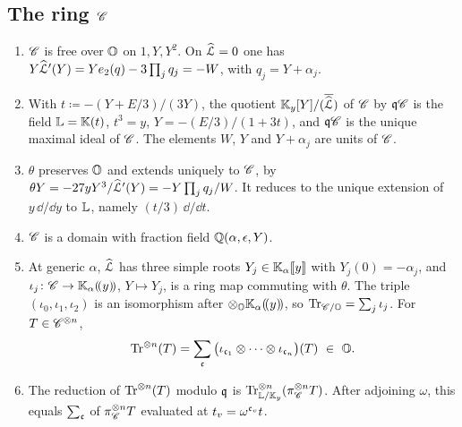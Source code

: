 \subsection{The ring \texorpdfstring{$\mathscr{C}$}{C}}

\begin{lem}
\label{lem:spe-ring}
\begin{enumerate}
\item $\mathscr{C}$ is free over $\mathbb{O}$ on $1,Y,Y^2$. On $\widehat{\mathcal{L}}=0$ one has $Y\widehat{\mathcal{L}}'(Y)=Ye_2(q)-3\prod_jq_j=-W$, with $q_j=Y+\alpha_j$.
\item With $t\coloneqq-(Y+E/3)/(3Y)$, the quotient $\mathbb{K}_{y}[Y]/(\overline{\widehat{\mathcal{L}}})$ of $\mathscr{C}$ by $\mathfrak{q}\mathscr{C}$ is the field $\mathbb{L}=\mathbb{K}(t)$, $t^3=y$, $Y=-(E/3)/(1+3t)$, and $\mathfrak{q}\mathscr{C}$ is the unique maximal ideal of $\mathscr{C}$. The elements $W$, $Y$ and $Y+\alpha_j$ are units of $\mathscr{C}$.
\item $\theta$ preserves $\mathbb{O}$ and extends uniquely to $\mathscr{C}$, by $\theta Y=-27yY^3/\widehat{\mathcal{L}}'(Y)=-Y\prod_jq_j/W$. It reduces to the unique extension of $y\,\dd/\dd y$ to $\mathbb{L}$, namely $(t/3)\,\dd/\dd t$.
\item $\mathscr{C}$ is a domain with fraction field $\mathbb{Q}(\alpha,\epsilon,Y)$.
\item At generic $\alpha$, $\widehat{\mathcal{L}}$ has three simple roots $Y_j\in\mathbb{K}_{\alpha}[\![ y ]\!]$ with $Y_j(0)=-\alpha_j$, and $\iota_j\colon\mathscr{C}\to\mathbb{K}_{\alpha}(\!(y)\!)$, $Y\mapsto Y_j$, is a ring map commuting with $\theta$. The triple $(\iota_0,\iota_1,\iota_2)$ is an isomorphism after $\otimes_{\mathbb{O}}\mathbb{K}_{\alpha}(\!(y)\!)$, so $\operatorname{Tr}_{\mathscr{C}/\mathbb{O}}=\sum_j\iota_j$. For $T\in\mathscr{C}^{\otimes n}$,
\[
\Tr^{\otimes n}(T)=\sum_{\col}\big(\iota_{\col_1}\otimes\dots\otimes\iota_{\col_n}\big)(T)\ \in\ \locO.
\]
\item The reduction of $\operatorname{Tr}^{\otimes n}(T)$ modulo $\mathfrak{q}$ is $\operatorname{Tr}_{\mathbb{L}/\mathbb{K}_{y}}^{\otimes n}(\pi_{\mathscr{C}}^{\otimes n}T)$. After adjoining $\omega$, this equals $\sum_{\mathfrak{c}}$ of $\pi_{\mathscr{C}}^{\otimes n}T$ evaluated at $t_v=\omega^{\mathfrak{c}_v}t$.
\end{enumerate}
\end{lem}


